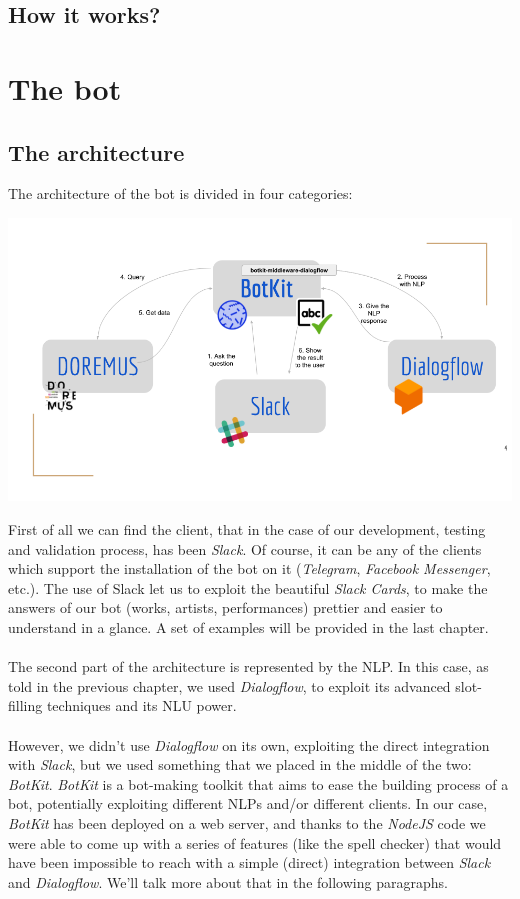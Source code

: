 \documentclass[a4paper,12pt]{report}
\begin{document}
	\section{How it works?}

\chapter{The bot}
	\section{The architecture}
	The architecture of the bot is divided in four categories:
	\begin{center}
		\includegraphics[scale=0.4]{architecture}
	\end{center}
	First of all we can find the client, that in the case of our development, testing and validation process, has been \textit{Slack}. Of course, it can be any of the clients which support the installation of the bot on it (\textit{Telegram}, \textit{Facebook Messenger}, etc.). The use of Slack let us to exploit the beautiful \textit{Slack Cards}, to make the answers of our bot (works, artists, performances) prettier and easier to understand in a glance. A set of examples will be provided in the last chapter.\\\\
	The second part of the architecture is represented by the NLP. In this case, as told in the previous chapter, we used \textit{Dialogflow}, to exploit its advanced slot-filling techniques and its NLU power.\\\\
	However, we didn't use \textit{Dialogflow} on its own, exploiting the direct integration with \textit{Slack}, but we used something that we placed in the middle of the two: \textit{BotKit}. \textit{BotKit} is a bot-making toolkit that aims to ease the building process of a bot, potentially exploiting different NLPs and/or different clients. In our case, \textit{BotKit} has been deployed on a web server, and thanks to the \textit{NodeJS} code we were able to come up with a series of features (like the spell checker) that would have been impossible to reach with a simple (direct) integration between \textit{Slack} and \textit{Dialogflow}. We'll talk more about that in the following paragraphs.\\\\
\end{document}
